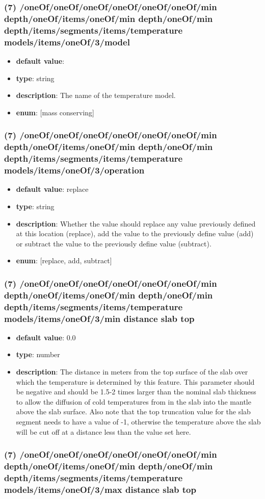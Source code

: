 \subsubsection{(7) /oneOf/oneOf/oneOf/oneOf/oneOf/oneOf/min depth/oneOf/items/oneOf/min depth/oneOf/min depth/items/segments/items/temperature models/items/oneOf/3/model}
\begin{itemize}[leftmargin=7em]\item {\bf default value}: 
\item {\bf type}: string
\item {\bf description}: The name of the temperature model.
\item {\bf enum}: [mass conserving]\end{itemize}\subsubsection{(7) /oneOf/oneOf/oneOf/oneOf/oneOf/oneOf/min depth/oneOf/items/oneOf/min depth/oneOf/min depth/items/segments/items/temperature models/items/oneOf/3/operation}
\begin{itemize}[leftmargin=7em]\item {\bf default value}: replace
\item {\bf type}: string
\item {\bf description}: Whether the value should replace any value previously defined at this location (replace), add the value to the previously define value (add) or subtract the value to the previously define value (subtract).
\item {\bf enum}: [replace, add, subtract]\end{itemize}\subsubsection{(7) /oneOf/oneOf/oneOf/oneOf/oneOf/oneOf/min depth/oneOf/items/oneOf/min depth/oneOf/min depth/items/segments/items/temperature models/items/oneOf/3/min distance slab top}
\begin{itemize}[leftmargin=7em]\item {\bf default value}: 0.0
\item {\bf type}: number
\item {\bf description}: The distance in meters from the top surface of the slab over which the temperature is determined by this feature. This parameter should be negative and should be 1.5-2 times larger than the nominal slab thickness to allow the diffusion of cold temperatures from in the slab into the mantle above the slab surface. Also note that the top truncation value for the slab segment needs to have a value of -1, otherwise the temperature above the slab will be cut off at a distance less than the value set here.
\end{itemize}\subsubsection{(7) /oneOf/oneOf/oneOf/oneOf/oneOf/oneOf/min depth/oneOf/items/oneOf/min depth/oneOf/min depth/items/segments/items/temperature models/items/oneOf/3/max distance slab top}
